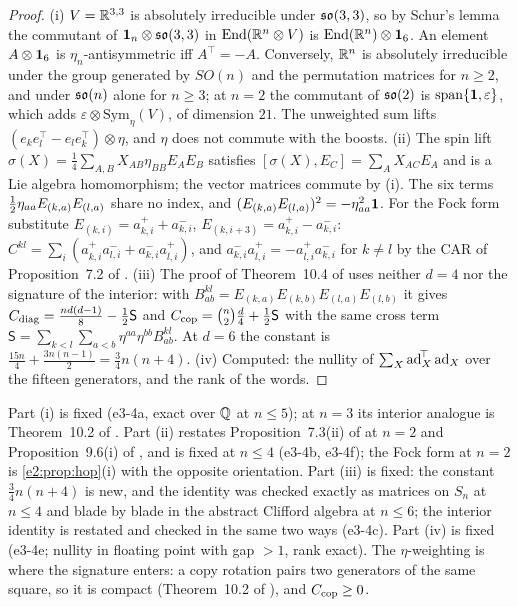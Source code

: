 \begin{proof}
(i) $V=\mathbb{R}^{3,3}$ is absolutely irreducible under $\mathfrak{so}(3,3)$, so by Schur's lemma the commutant of $\mathbf 1_n\otimes\mathfrak{so}(3,3)$ in $\operatorname{End}(\mathbb{R}^n\otimes V)$ is
$\operatorname{End}(\mathbb{R}^n)\otimes\mathbf 1_6$. An element $A\otimes\mathbf 1_6$ is $\eta_n$-antisymmetric iff $A^{\!\top}=-A$. Conversely, $\mathbb{R}^n$ is absolutely irreducible under
the group generated by $SO(n)$ and the permutation matrices for $n\ge2$, and under $\mathfrak{so}(n)$ alone for $n\ge3$; at $n=2$ the commutant of $\mathfrak{so}(2)$
is $\operatorname{span}\{\mathbf 1,\varepsilon\}$, which adds $\varepsilon\otimes\mathrm{Sym}_\eta(V)$, of dimension $21$. The unweighted sum lifts
$(e_ke_l^{\!\top}-e_le_k^{\!\top})\otimes\eta$, and $\eta$ does not commute with the boosts. (ii) The spin lift $\sigma(X)=\tfrac14\sum_{A,B}X_{AB}\eta_{BB}E_AE_B$
satisfies $[\sigma(X),E_C]=\sum_AX_{AC}E_A$ and is a Lie algebra homomorphism; the vector matrices commute by (i). The six terms
$\tfrac12\eta_{aa}E_{(k,a)}E_{(l,a)}$ share no index, and $(E_{(k,a)}E_{(l,a)})^2=-\eta_{aa}^2\mathbf 1$. For the Fock form substitute
$E_{(k,i)}=a^+_{k,i}+a^-_{k,i}$, $E_{(k,i+3)}=a^+_{k,i}-a^-_{k,i}$: $C^{kl}=\sum_i(a^+_{k,i}a^-_{l,i}+a^-_{k,i}a^+_{l,i})$, and $a^-_{k,i}a^+_{l,i}=-a^+_{l,i}a^-_{k,i}$ for
$k\ne l$ by the CAR of Proposition~7.2 of \cite{RE}. (iii) The proof of Theorem~10.4 of \cite{ES17} uses neither $d=4$ nor the signature of the
interior: with $B^{kl}_{ab}=E_{(k,a)}E_{(k,b)}E_{(l,a)}E_{(l,b)}$ it gives $C_{\rm diag}=\tfrac{nd(d-1)}8-\tfrac12\mathsf S$ and $C_{\rm cop}=\binom n2\tfrac d4+\tfrac12\mathsf S$
with the same cross term $\mathsf S=\sum_{k<l}\sum_{a<b}\eta^{aa}\eta^{bb}B^{kl}_{ab}$. At $d=6$ the constant is $\tfrac{15n}4+\tfrac{3n(n-1)}2=\tfrac34n(n+4)$.
(iv) Computed: the nullity of $\sum_X\operatorname{ad}_X^{\!\top}\operatorname{ad}_X$ over the fifteen generators, and the rank of the words.
\end{proof}

Part (i) is fixed (e3-4a, exact over $\mathbb{Q}$ at $n\le5$); at $n=3$ its interior analogue is Theorem~10.2 of \cite{ES17}. Part (ii) restates
Proposition~7.3(ii) of \cite{RE} at $n=2$ and Proposition~9.6(i) of \cite{RE}, and is fixed at $n\le4$ (e3-4b, e3-4f); the Fock form at $n=2$ is
\cref{e2:prop:hop}(i) with the opposite orientation. Part (iii) is fixed: the constant $\tfrac34n(n+4)$ is new, and the identity was checked exactly
as matrices on $S_n$ at $n\le4$ and blade by blade in the abstract Clifford algebra at $n\le6$; the interior identity is restated and checked in
the same two ways (e3-4c). Part (iv) is fixed (e3-4e; nullity in floating point with gap $>1$, rank exact). The $\eta$-weighting is where the
signature enters: a copy rotation pairs two generators of the same square, so it is compact (Theorem~10.2 of \cite{ES17}), and $C_{\rm cop}\ge0$.

